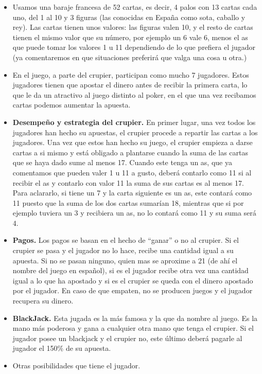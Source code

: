 \documentclass[12pt,a4paper,]{book}
\numberwithin{dummy}{section}
\theoremstyle{ocrenumbox}
\theoremstyle{blacknumex}
\theoremstyle{blacknumbox}
\theoremstyle{ocrenum}
\theoremstyle{ocrenum}
\begin{document}
\begin{itemize}
\item
  Usamos una baraje francesa de 52 cartas, es decir, 4 palos con 13
  cartas cada uno, del 1 al 10 y 3 figuras (las conocidas en España como
  sota, caballo y rey). Las cartas tienen unos valores: las figuras
  valen 10, y el resto de cartas tienen el mismo valor que su número,
  por ejemplo un 6 vale 6, menos el as que puede tomar los valores 1 u
  11 dependiendo de lo que prefiera el jugador (ya comentaremos en que
  situaciones preferirá que valga una cosa u otra.)
\item
  En el juego, a parte del crupier, participan como mucho 7 jugadores.
  Estos jugadores tienen que apostar el dinero antes de recibir la
  primera carta, lo que le da un atractivo al juego distinto al poker,
  en el que una vez recibamos cartas podemos aumentar la apuesta.
\item
  \textbf{Desempeño y estrategia del crupier.} En primer lugar, una vez
  todos los jugadores han hecho su apuestas, el crupier procede a
  repartir las cartas a los jugadores. Una vez que estos han hecho su
  juego, el crupier empieza a darse cartas a si mismo y está obligado a
  plantarse cuando la suma de las cartas que se haya dado sume al menos
  17. Cuando este tenga un as, que ya comentamos que pueden valer 1 u 11
  a gusto, deberá contarlo como 11 si al recibir el as y contarlo con
  valor 11 la suma de sus cartas es al menos 17. Para aclararlo, si
  tiene un 7 y la carta siguiente es un as, este contará como 11 puesto
  que la suma de los dos cartas sumarían 18, mientras que si por ejemplo
  tuviera un 3 y recibiera un as, no lo contará como 11 y su suma será
  4.
\item
  \textbf{Pagos.} Los pagos se basan en el hecho de ``ganar'' o no al
  crupier. Si el crupier se pasa y el jugador no lo hace, recibe una
  cantidad igual a su apuesta. Si no se pasan ninguno, quien mas se
  aproxime a 21 (de ahí el nombre del juego en español), si es el
  jugador recibe otra vez una cantidad igual a lo que ha apostado y si
  es el crupier se queda con el dinero apostado por el jugador. En caso
  de que empaten, no se producen juegos y el jugador recupera su dinero.
\item
  \textbf{BlackJack.} Esta jugada es la más famosa y la que da nombre al
  juego. Es la mano más poderosa y gana a cualquier otra mano que tenga
  el crupier. Si el jugador posee un blackjack y el crupier no, este
  último deberá pagarle al jugador el 150\% de su apuesta.
\item
  Otras posibilidades que tiene el jugador.


\end{itemize}
\end{document}

